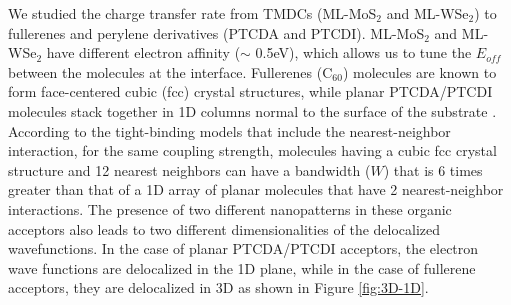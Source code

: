 \documentclass[12pt]{article}
\begin{document}
We studied the charge transfer rate from TMDCs (ML-MoS$_2$ and ML-WSe$_2$) to fullerenes and perylene derivatives (PTCDA and PTCDI). ML-MoS$_2$ and ML-WSe$_2$ have different electron affinity ($\sim$ 0.5eV), which allows us to tune the $E_{off}$ between the molecules at the interface. Fullerenes (C$_{60}$) molecules are known to form face-centered cubic (fcc) crystal structures, while planar PTCDA/PTCDI molecules stack together in 1D columns normal to the surface of the substrate \cite{ching1991first,ludwig1994stm}. According to the tight-binding models that include the nearest-neighbor interaction, for the same coupling strength, molecules having a cubic fcc crystal structure and 12 nearest neighbors can have a bandwidth ($W$) that is 6 times greater than that of a 1D array of planar molecules that have 2 nearest-neighbor interactions. The presence of two different nanopatterns in these organic acceptors also leads to two different dimensionalities of the delocalized wavefunctions. In the case of planar PTCDA/PTCDI acceptors, the electron wave functions are delocalized in the 1D plane, while in the case of fullerene acceptors, they are delocalized in 3D as shown in Figure \ref{fig:3D-1D}.
\end{document}
